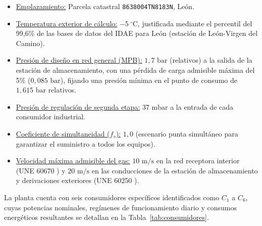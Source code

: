 \documentclass[12pt]{article}
\begin{document}
        \begin{itemize}
            \item \underline{Emplazamiento:} Parcela catastral \texttt{8638004TN8183N}, León.
            \item \underline{Temperatura exterior de cálculo:} $-5\ ^{\circ}\text{C}$, justificada mediante el percentil del 99,6\% de las bases de datos del IDAE para León (estación de León-Virgen del Camino).
            \item \underline{Presión de diseño en red general (MPB):} $1,7\text{ bar}$ (relativos) a la salida de la estación de almacenamiento, con una pérdida de carga admisible máxima del 5\% ($0,085\text{ bar}$), fijando una presión mínima en el punto de consumo de $1,615\text{ bar}$ relativos.
            \item \underline{Presión de regulación de segunda etapa:} $37\text{ mbar}$ a la entrada de cada consumidor industrial.
            \item \underline{Coeficiente de simultaneidad ($f_s$):} $1,0$ (escenario punta simultáneo para garantizar el suministro a todos los equipos).
            \item \underline{Velocidad máxima admisible del gas:} $10\text{ m/s}$ en la red receptora interior (UNE 60670 \cite{une60670}) y $20\text{ m/s}$ en las conducciones de la estación de almacenamiento y derivaciones exteriores (UNE 60250 \cite{une60250}).
        \end{itemize}

        La planta cuenta con seis consumidores específicos identificados como $C_1$ a $C_6$, cuyas potencias nominales, regímenes de funcionamiento diario y consumos energéticos resultantes se detallan en la Tabla~\ref{tab:consumidores}.
\end{document}
